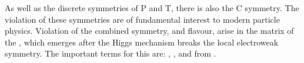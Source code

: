 As well as the discrete symmetries of \gls{P} and \gls{T}, there is also the \gls{C} symmetry.
The violation of these symmetries are of fundamental interest
to modern particle physics.
Violation of the combined \CP symmetry, and flavour, arise in the \ckm matrix of the \sm, which emerges
after the Higgs mechanism breaks the local electroweak symmetry.
The important terms for this are: , , and  from .

